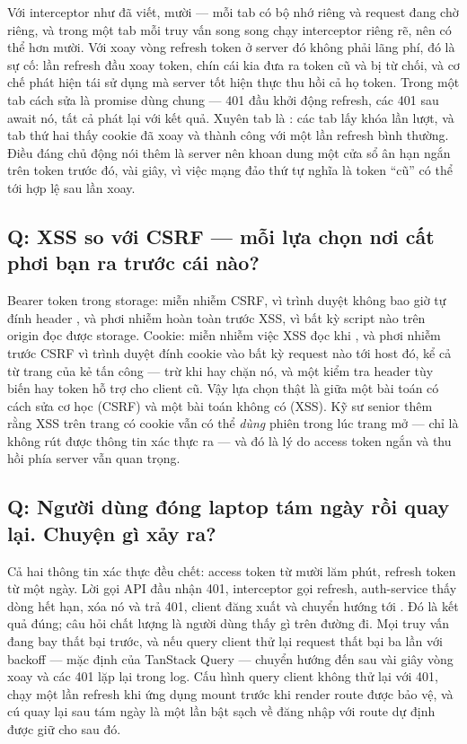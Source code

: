 Với interceptor như đã viết, mười --- mỗi tab có bộ nhớ riêng và
request đang chờ riêng, và trong một tab mỗi truy vấn song song chạy
interceptor riêng rẽ, nên có thể hơn mười. Với xoay vòng refresh token
ở server đó không phải lãng phí, đó là sự cố: lần refresh đầu xoay
token, chín cái kia đưa ra token cũ và bị từ chối, và cơ chế phát hiện
tái sử dụng mà server tốt hiện thực thu hồi cả họ token. Trong một tab
cách sửa là promise dùng chung --- 401 đầu khởi động refresh, các 401
sau await nó, tất cả phát lại với kết quả. Xuyên tab là
: các tab lấy khóa lần lượt, và tab thứ hai thấy
cookie đã xoay và thành công với một lần refresh bình thường. Điều đáng
chủ động nói thêm là server nên khoan dung một cửa sổ ân hạn ngắn trên
token trước đó, vài giây, vì việc mạng đảo thứ tự nghĩa là token ``cũ''
có thể tới hợp lệ sau lần xoay.

\subsection*{Q: XSS so với CSRF --- mỗi lựa chọn nơi cất phơi bạn ra trước cái nào?}

Bearer token trong storage: miễn nhiễm CSRF, vì trình duyệt không bao
giờ tự đính header , và phơi nhiễm hoàn toàn trước
XSS, vì bất kỳ script nào trên origin đọc được storage. Cookie: miễn
nhiễm việc XSS đọc khi , và phơi nhiễm trước CSRF vì
trình duyệt đính cookie vào bất kỳ request nào tới host đó, kể cả từ
trang của kẻ tấn công --- trừ khi  hay
 chặn nó, và một kiểm tra header tùy biến hay token hỗ trợ
cho client cũ. Vậy lựa chọn thật là giữa một bài toán có cách sửa cơ
học (CSRF) và một bài toán không có (XSS). Kỹ sư senior thêm rằng XSS
trên trang có cookie  vẫn có thể \emph{dùng} phiên trong
lúc trang mở --- chỉ là không rút được thông tin xác thực ra --- và đó
là lý do access token ngắn và thu hồi phía server vẫn quan trọng.

\subsection*{Q: Người dùng đóng laptop tám ngày rồi quay lại. Chuyện gì xảy ra?}

Cả hai thông tin xác thực đều chết: access token từ mười lăm phút,
refresh token từ một ngày. Lời gọi API đầu nhận 401, interceptor gọi
refresh, auth-service thấy dòng hết hạn, xóa nó và trả 401, client
đăng xuất và chuyển hướng tới . Đó là kết quả đúng; câu
hỏi chất lượng là người dùng thấy gì trên đường đi. Mọi truy vấn đang
bay thất bại trước, và nếu query client thử lại request thất bại ba lần
với backoff --- mặc định của TanStack Query --- chuyển hướng đến sau vài
giây vòng xoay và các 401 lặp lại trong log. Cấu hình query client
không thử lại với 401, chạy một lần refresh khi ứng dụng mount trước
khi render route được bảo vệ, và cú quay lại sau tám ngày là một lần
bật sạch về đăng nhập với route dự định được giữ cho sau đó.

